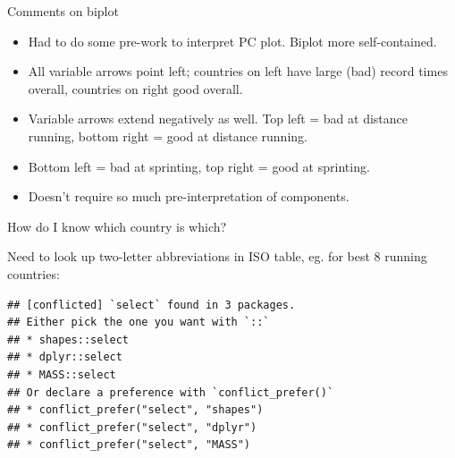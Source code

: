 \documentclass[ignorenonframetext,]{beamer}
\newenvironment{Shaded}{\begin{snugshade}}{\end{snugshade}}
\newcommand{\DataTypeTok}[1]{\textcolor[rgb]{0.13,0.29,0.53}{#1}}
\newcommand{\DecValTok}[1]{\textcolor[rgb]{0.00,0.00,0.81}{#1}}
\newcommand{\FloatTok}[1]{\textcolor[rgb]{0.00,0.00,0.81}{#1}}
\newcommand{\KeywordTok}[1]{\textcolor[rgb]{0.13,0.29,0.53}{\textbf{#1}}}
\newcommand{\NormalTok}[1]{#1}
\newcommand{\OperatorTok}[1]{\textcolor[rgb]{0.81,0.36,0.00}{\textbf{#1}}}
\newcommand{\StringTok}[1]{\textcolor[rgb]{0.31,0.60,0.02}{#1}}
\begin{document}
\begin{frame}{Comments on biplot}
\protect\hypertarget{comments-on-biplot}{}

\begin{itemize}
\item
  Had to do some pre-work to interpret PC plot. Biplot more
  self-contained.
\item
  All variable arrows point left; countries on left have large (bad)
  record times overall, countries on right good overall.
\item
  Variable arrows extend negatively as well. Top left = bad at distance
  running, bottom right = good at distance running.
\item
  Bottom left = bad at sprinting, top right = good at sprinting.
\item
  Doesn't require so much pre-interpretation of components.
\end{itemize}

\end{frame}

\begin{frame}[fragile]{How do I know which country is which?}
\protect\hypertarget{how-do-i-know-which-country-is-which}{}

Need to look up two-letter abbreviations in ISO table, eg. for best 8
running countries:

\begin{Shaded}
\end{Shaded}

\begin{verbatim}
## [conflicted] `select` found in 3 packages.
## Either pick the one you want with `::` 
## * shapes::select
## * dplyr::select
## * MASS::select
## Or declare a preference with `conflict_prefer()`
## * conflict_prefer("select", "shapes")
## * conflict_prefer("select", "dplyr")
## * conflict_prefer("select", "MASS")
\end{verbatim}

\end{frame}
\end{document}
